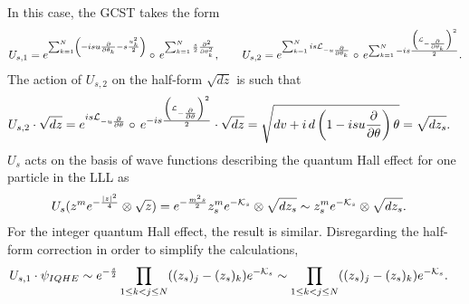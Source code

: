 \documentclass[notas.tex]{subfiles} 				%
\begin{document}
In this case, the GCST takes the form
\begin{align*}
	U_{s,1} = e^{\sum_{k=1}^{N} \left(- isu\pd{\theta_k} - s\frac{u_k^2}{2} \right)} \circ e^{\sum_{k=1}^{N} \frac{s}{2}\frac{\partial^2}{\partial \theta_k^2}}, \qquad U_{s,2} = e^{\sum_{k=1}^{N} i s\lied{-u \pd{\theta_k}} } \circ e^{\sum_{k=1}^{N} - i s \frac{\left( \lied{-\pd{\theta_k}}\right)^2}{2}}.
\end{align*}
The action of $U_{s,2}$ on the half-form $\sqrt{dz}$ is such that
\begin{align*}
	U_{s,2} \cdot \sqrt{dz} &= e^{i s\lied{-u \pd{\theta}} } \circ e^{- i s \frac{\left( \lied{-\pd{\theta}}\right)^2}{2}} \cdot \sqrt{dz} = \sqrt{dv + i \, d \left( 1 - i s u \pd{\theta} \right)\theta} = \sqrt{dz_{s}}.
\end{align*}
$U_{s}$ acts on the basis of wave functions describing the quantum Hall effect for one particle in the LLL as
\begin{align} \label{eq_spf_plane}
U_s(z^m e^{-\frac{\left|z\right|^2}{4}} \otimes \sqrt{z}) &= e^{-\frac{m^2s}{2}}z_{s}^m e^{-\mathcal{K}_s} \otimes \sqrt{dz_s} \sim z_{s}^m e^{-\mathcal{K}_s} \otimes \sqrt{dz_s}.
\end{align}
For the integer quantum Hall effect, the result is similar. Disregarding the half-form correction in order to simplify the calculations, 
\begin{align*}
	U_{s,1} \cdot \psi_{IQHE} &\sim e^{-\frac{s}{2}} \prod_{1 \leq k<j \leq N}((z_s)_j - (z_s)_k) e^{-\mathcal{K}_s} \sim \prod_{1 \leq k<j \leq N}((z_s)_j - (z_s)_k) e^{-\mathcal{K}_s}.
\end{align*}
\end{document}
